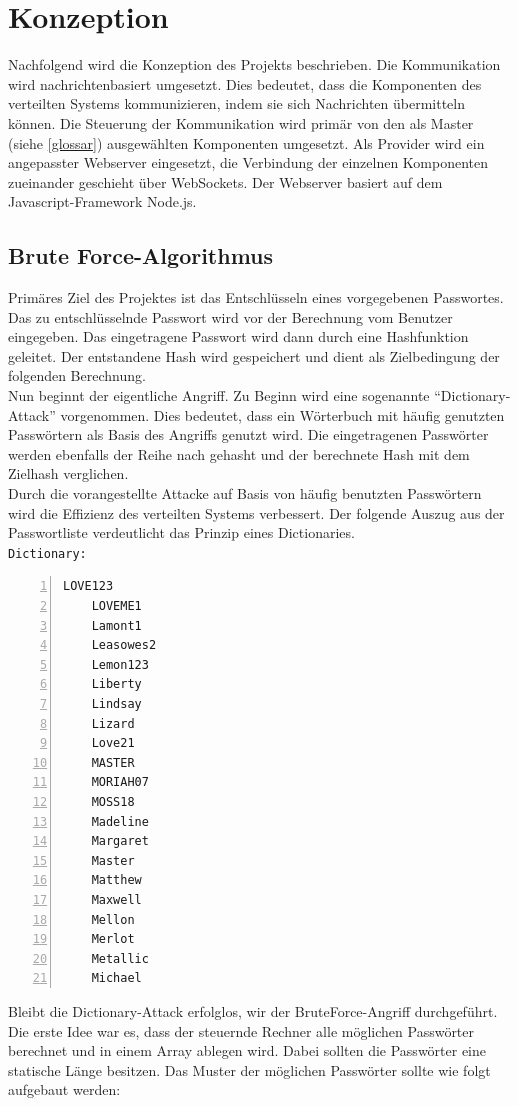 \chapter{Konzeption}
\label{Konzeption}
Nachfolgend wird die Konzeption des Projekts beschrieben. 
Die Kommunikation wird nachrichtenbasiert umgesetzt. Dies bedeutet, dass die Komponenten des verteilten Systems kommunizieren, indem sie sich Nachrichten übermitteln können. Die Steuerung der Kommunikation wird primär von den als Master 
(siehe \ref{glossar}) ausgewählten Komponenten umgesetzt. Als Provider wird ein angepasster Webserver eingesetzt, die Verbindung der einzelnen Komponenten zueinander geschieht über WebSockets. Der Webserver basiert auf dem Javascript-Framework Node.js. \\


\section{Brute Force-Algorithmus}
\label{ideeBruteForce}
Primäres Ziel des Projektes ist das Entschlüsseln eines vorgegebenen Passwortes. Das zu entschlüsselnde Passwort wird vor der Berechnung vom Benutzer eingegeben. Das eingetragene Passwort wird dann durch eine Hashfunktion geleitet. Der entstandene Hash wird gespeichert und dient als Zielbedingung der folgenden Berechnung. \\
Nun beginnt der eigentliche Angriff. Zu Beginn wird eine sogenannte \enquote{Dictionary-Attack} vorgenommen. Dies bedeutet, dass ein Wörterbuch mit häufig genutzten Passwörtern als Basis des Angriffs genutzt wird. Die eingetragenen Passwörter werden ebenfalls der Reihe nach gehasht und der berechnete Hash mit dem Zielhash verglichen. \\
 Durch die vorangestellte Attacke auf Basis von häufig benutzten Passwörtern wird die Effizienz des verteilten Systems verbessert. Der folgende Auszug aus der Passwortliste  verdeutlicht das Prinzip eines Dictionaries. \\
 \newpage
\texttt{Dictionary:}
\begin{lstlisting}[basicstyle=\ttfamily,numbers=left,numberstyle=\footnotesize\ttfamily,backgroundcolor=\color{sourcegray}]
	LOVE123
	LOVEME1
	Lamont1
	Leasowes2
	Lemon123
	Liberty
	Lindsay
	Lizard
	Love21
	MASTER
	MORIAH07
	MOSS18
	Madeline
	Margaret
	Master
	Matthew
	Maxwell
	Mellon
	Merlot
	Metallic
	Michael
\end{lstlisting}



Bleibt die Dictionary-Attack erfolglos, wir der BruteForce-Angriff durchgeführt. \\
Die erste Idee war es, dass der steuernde Rechner alle möglichen Passwörter berechnet und in einem Array ablegen wird. Dabei sollten die Passwörter eine statische Länge besitzen. Das Muster der möglichen Passwörter sollte wie folgt aufgebaut werden: \\

